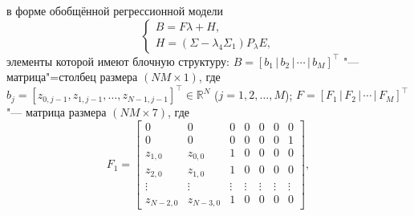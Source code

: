 в форме обобщённой регрессионной модели
\begin{equation}
\begin{cases}
B=F\lambda+H,\\
H=(\Sigma-\lambda_4\Sigma_1)P_{\lambda}E,
\end{cases}
\end{equation}
элементы которой имеют  блочную структуру: $B=[b_1 \, | \, b_2 \, | \, \cdots \, | \, b_M]^\top$ "--- матрица"=столбец размера $(NM{\times}1)$, где $b_j=[z_{0,j-1}, z_{1,j-1}, \dots, z_{N-1,j-1}]^\top \in \mathbb R^N$ ($j=1, 2,  \dots, M$); 
$F=[F_1 \, | \, F_2 \, | \, \cdots\, | \, F_M]^\top$ "--- матрица размера $(NM{\times}7)$, где
\[
F_1= \begin{bmatrix}
0 & 0 & 0 & 0 & 0 & 0 & 0 \\
0 & 0 & 0 & 0 & 0 & 0 & 1 \\
z_{1,0} & z_{0,0} & 1 & 0 & 0 & 0 & 0 \\
z_{2,0} & z_{1,0} & 1 & 0 & 0 & 0 & 0 \\
\vdots & \vdots & \vdots & \vdots & \vdots & \vdots & \vdots \\
z_{N-2,0} & z_{N-3,0} & 1 & 0 & 0 & 0 & 0
\end{bmatrix} ,
\]
